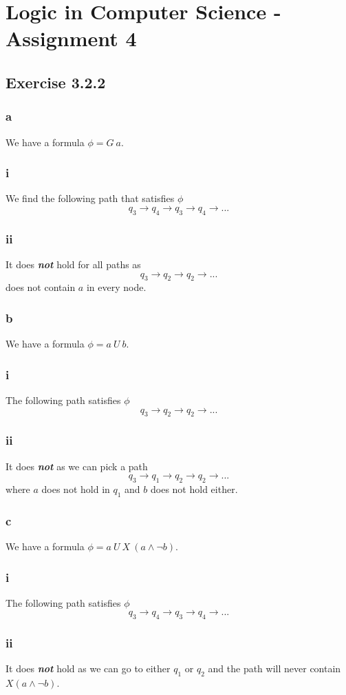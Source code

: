 \documentclass[12pt]{article}
\author{Nikolaj Dybdahl Rathcke}
\begin{document}
\section*{Logic in Computer Science - Assignment 4}
\subsection*{Exercise 3.2.2}
\subsubsection*{a}
We have a formula $\phi=G\:a$.
\subsubsection*{i}
We find the following path that satisfies $\phi$
$$q_3\to q_4\to q_3\to q_4\to ...$$
\subsubsection*{ii}
It does \textit{\textbf{not}} hold for all paths as
$$q_3\to q_2\to q_2\to ...$$
does not contain $a$ in every node.

\subsubsection*{b}
We have a formula $\phi=a\:U\:b$.
\subsubsection*{i}
The following path satisfies $\phi$
$$q_3\to q_2\to q_2\to ...$$
\subsubsection*{ii}
It does \textit{\textbf{not}} as we can pick a path 
$$q_3\to q_1\to q_2\to q_2\to ...$$
where $a$ does not hold in $q_1$ and $b$ does not hold either.

\subsubsection*{c}
We have a formula $\phi=a\:U\:X\:(a\land\neg b)$.
\subsubsection*{i}
The following path satisfies $\phi$
$$q_3\to q_4\to q_3\to q_4\to ...$$
\subsubsection*{ii}
It does \textit{\textbf{not}} hold as we can go to either $q_1$ or $q_2$ and the path will never contain $X(a\land \neg b)$. 
\end{document}

